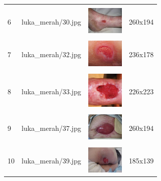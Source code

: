 \begin{table}[H]
\begin{tabular}{|m{0.2in}|m{1.2in}|m{0.7in}|m{0.7in}|}
		& &  &  \\
		6& 
		luka\_merah/30.jpg &
		\includegraphics[width=0.7in]{gambar/dataset_citra/luka_merah/bahan/30.jpg}&
		260x194\\
		\hline
		
		& &  &  \\
		7& 
		luka\_merah/32.jpg &
		\includegraphics[width=0.7in]{gambar/dataset_citra/luka_merah/bahan/32.jpg}&
		236x178\\
		\hline

			
		& &  &  \\
		8 & 
		luka\_merah/33.jpg &
		\includegraphics[width=0.7in]{gambar/dataset_citra/luka_merah/bahan/33.jpg}&
		226x223\\
		\hline
		
		& &  &  \\
		9& 
		luka\_merah/37.jpg &
		\includegraphics[width=0.7in]{gambar/dataset_citra/luka_merah/bahan/37.jpg}&
		260x194\\
		\hline
		
		& &  &  \\
		10& 
		luka\_merah/39.jpg &
		\includegraphics[width=0.7in]{gambar/dataset_citra/luka_merah/bahan/39.jpg}&
		185x139\\
		\hline

	\end{tabular}
\end{table}

